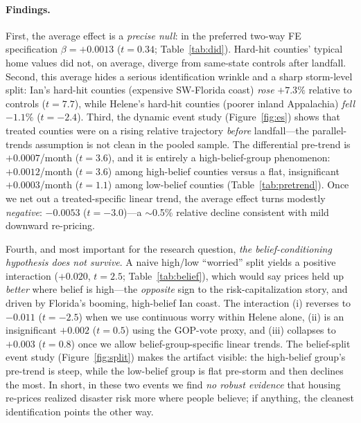\documentclass[12pt]{article}
\begin{document}
\paragraph{Findings.} First, the average effect is a \emph{precise null}: in the preferred
two-way FE specification $\beta=+0.0013$ ($t=0.34$; Table~\ref{tab:did}). Hard-hit counties'
typical home values did not, on average, diverge from same-state controls after landfall.
Second, this average hides a serious identification wrinkle and a sharp storm-level split:
Ian's hard-hit counties (expensive SW-Florida coast) \emph{rose} $+7.3\%$ relative to
controls ($t=7.7$), while Helene's hard-hit counties (poorer inland Appalachia) \emph{fell}
$-1.1\%$ ($t=-2.4$). Third, the dynamic event study (Figure~\ref{fig:es}) shows that treated
counties were on a rising relative trajectory \emph{before} landfall---the parallel-trends
assumption is not clean in the pooled sample. The differential pre-trend is $+0.0007$/month
($t=3.6$), and it is entirely a high-belief-group phenomenon: $+0.0012$/month ($t=3.6$) among
high-belief counties versus a flat, insignificant $+0.0003$/month ($t=1.1$) among low-belief
counties (Table~\ref{tab:pretrend}). Once we net out a treated-specific linear trend, the
average effect turns modestly \emph{negative}: $-0.0053$ ($t=-3.0$)---a $\sim$0.5\% relative
decline consistent with mild downward re-pricing.

Fourth, and most important for the research question, \emph{the belief-conditioning
hypothesis does not survive}. A naive high/low ``worried'' split yields a positive
interaction ($+0.020$, $t=2.5$; Table~\ref{tab:belief}), which would say prices held up
\emph{better} where belief is high---the \emph{opposite} sign to the risk-capitalization
story, and driven by Florida's booming, high-belief Ian coast. The interaction (i) reverses
to $-0.011$ ($t=-2.5$) when we use continuous worry within Helene alone, (ii) is an
insignificant $+0.002$ ($t=0.5$) using the GOP-vote proxy, and (iii) collapses to $+0.003$
($t=0.8$) once we allow belief-group-specific linear trends. The belief-split event study
(Figure~\ref{fig:split}) makes the artifact visible: the high-belief group's pre-trend is
steep, while the low-belief group is flat pre-storm and then declines the most. In short, in
these two events we find \emph{no robust evidence} that housing re-prices realized disaster
risk more where people believe; if anything, the cleanest identification points the other
way.
\end{document}
